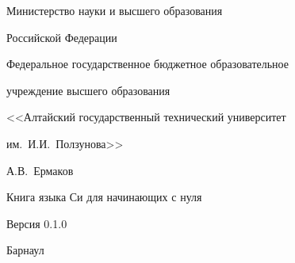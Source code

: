\documentclass[myc.tex]{subfiles}
\begin{document}
\begin{titlepage}
\begin{center}
Министерство науки и высшего образования

Российской Федерации

Федеральное государственное бюджетное образовательное

учреждение высшего образования

<<Алтайский государственный технический университет

им.~И.И.~Ползунова>>

\vfill

А.В.~Ермаков

\vspace{12pt}
\begin{Large}Книга языка Си для начинающих с нуля\end{Large}
\vspace{12pt}

Версия 0.1.0

\vfill

Барнаул \the\year
\end{center}
\end{titlepage} 
\end{document}
